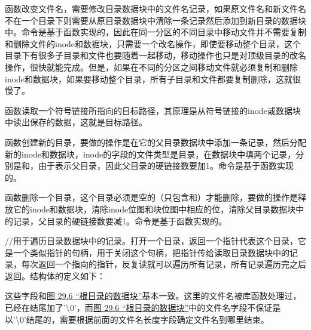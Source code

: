 函数改变文件名，需要修改目录数据块中的文件名记录，如果原文件名和新文件名不在一个目录下则需要从原目录数据块中清除一条记录然后添加到新目录的数据块中。命令是基于函数实现的，因此在同一分区的不同目录中移动文件并不需要复制和删除文件的inode和数据块，只需要一个改名操作，即使要移动整个目录，这个目录下有很多子目录和文件也要随着一起移动，移动操作也只是对顶级目录的改名操作，很快就能完成。但是，如果在不同的分区之间移动文件就必须复制和删除inode和数据块，如果要移动整个目录，所有子目录和文件都要复制删除，这就很慢了。



函数读取一个符号链接所指向的目标路径，其原理是从符号链接的inode或数据块中读出保存的数据，这就是目标路径。



函数创建新的目录，要做的操作是在它的父目录数据块中添加一条记录，然后分配新的inode和数据块，inode的字段的文件类型是目录，在数据块中填两个记录，分别是和，由于表示父目录，因此父目录的硬链接数要加1。命令是基于函数实现的。



函数删除一个目录，这个目录必须是空的（只包含和）才能删除，要做的操作是释放它的inode和数据块，清除inode位图和块位图中相应的位，清除父目录数据块中的记录，父目录的硬链接数要减1。命令是基于函数实现的。



//用于遍历目录数据块中的记录。打开一个目录，返回一个指针代表这个目录，它是一个类似指针的句柄，用于关闭这个句柄，把指针传给读取目录数据块中的记录，每次返回一个指向的指针，反复读就可以遍历所有记录，所有记录遍历完之后返回。结构体的定义如下：




这些字段和\hyperlink{db.ch29s02.id2858972}{图 29.\BookSplit{}6 “根目录的数据块”}基本一致。这里的文件名被库函数处理过，已经在结尾加了'\textbackslash{}0'，而\hyperlink{db.ch29s02.id2858972}{图 29.\BookSplit{}6 “根目录的数据块”}中的文件名字段不保证是以'\textbackslash{}0'结尾的，需要根据前面的文件名长度字段确定文件名到哪里结束。



